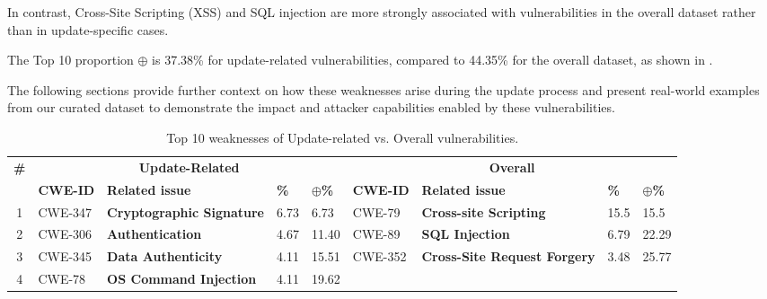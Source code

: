 \documentclass[fleqn,s1,names,tex]{neptune}
\begin{document}
In contrast, Cross-Site Scripting (XSS) and SQL injection are more strongly associated with vulnerabilities in the overall dataset rather than in update-specific cases.



The Top 10 proportion $\oplus$ is 37.38\% for update-related vulnerabilities, compared to 44.35\% for the overall dataset, as shown in .


The following sections provide further context on how these weaknesses arise during the update process and present real-world examples from our curated dataset to demonstrate the impact and attacker capabilities enabled by these vulnerabilities.

\begin{table}
\caption{Top 10 weaknesses of Update-related vs. Overall vulnerabilities.}
\bstmfloatsrc
\begin{fsrc}
\tblfont
\begin{tabular*}{375pt}{@{}c|llll|llll@{}}
\toprule
\textbf{\#}  & \multicolumn{4}{c}{\textbf{Update-Related}} 
 & \multicolumn{4}{c}{\textbf{Overall}} \\
\cmidrule(lr){2-5} \cmidrule{6-9}


& \textbf{CWE-ID} 
& \textbf{Related issue} 
&\textbf {\%} 
& \textbf{$\oplus$\%} 
&\textbf {CWE-ID} 
& \textbf{Related issue} 
&\textbf {\%} 
& \textbf{$\oplus$\%}  \\
\midrule

1 &
\cellcolor{red!20}CWE-347 &
\cellcolor{red!20}\textbf{Cryptographic Signature} &
\cellcolor{gray!40}6.73 &
6.73 &

CWE-79 &
\textbf{Cross-site Scripting} &
\cellcolor{gray!40}15.5 &
15.5 \\

2 &
\cellcolor{red!20}CWE-306 &
\cellcolor{red!20}\textbf{Authentication} &
\cellcolor{gray!40}4.67 &
11.40 &

CWE-89 &
\textbf{SQL Injection} &
\cellcolor{gray!40}6.79 &
22.29  \\

3 &
\cellcolor{red!20}CWE-345 &
\cellcolor{red!20}\textbf{Data Authenticity} &
\cellcolor{gray!40}4.11 &
15.51 &

CWE-352 &
\textbf{Cross-Site Request Forgery} &
\cellcolor{gray!40}3.48 &
25.77  \\

4 &
\cellcolor{blue!12}CWE-78 &
\cellcolor{blue!12}\textbf{OS Command Injection} &
\cellcolor{gray!40}4.11 &
19.62 &


\end{tabular*}
\end{fsrc}
\end{table}
\end{document}
